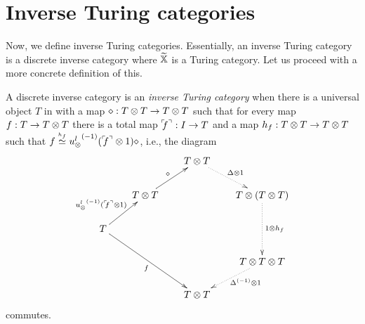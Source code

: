 \section{Inverse Turing categories}
\label{sec:inverse_turing_categories}
Now, we define inverse Turing categories. Essentially, an inverse Turing category is a discrete
inverse category \X where $\widetilde{\mathbb{X}}$ is a Turing category. Let us proceed with a more concrete
definition of this.

\begin{definition}\label{def:inverse_turing_category}
  A discrete inverse category \X is an \emph{inverse Turing category} when there is a universal object $T$ in
  \X with a map $\diamond :T\otimes T \to T\otimes T$ such that for every map $f:T \to T\otimes T$ there is a total map
  ${}^\ulcorner\!\!f^\urcorner: I\to T$ and a map $h_f:T\otimes T \to T\otimes T$ such that $f \overset{\scriptscriptstyle h_f}{\simeq}
  {u_{\otimes}^l}^{(-1)}({}^\ulcorner\!\!f^\urcorner\otimes1)\diamond$, i.e., the diagram
  \[
    \xymatrix @C=20pt @R=20pt{
      & & T \* T \ar@{.>}[dr]^{\Delta\* 1}\\
      &T\*T \ar[ur]^{\diamond} & & T \* (T\* T) \ar@{.>}[dd]^{1\*h_f}\\
      T \ar[ur]^{\inv{\usl}(\iname{f}\*1)} \ar[ddrr]_{f} \\
      & & & T \* T\*T \ar@{.>}[dl]^(.4){\inv{\Delta}\* 1}\\
      && T\*T
    }
  \]
  commutes.
\end{definition}

